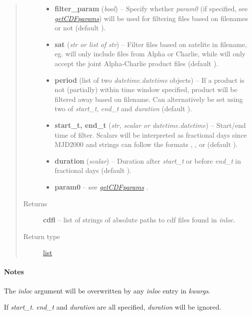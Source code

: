 \documentclass[letterpaper,10pt,english]{sphinxhowto}
\begin{document}
\begin{fulllineitems}
\begin{quote}
\begin{description}
\begin{itemize}
\item {} 
\textbf{filter\_param} (\emph{bool}) --
Specify whether \emph{param0} (if specified, see {\hyperref[swtools_doc:getcdfparams]{\emph{getCDFparams}}}) will
be used for filtering files based on filenames or not
(default ).

\item {} 
\textbf{sat} (\emph{str or list of str}) --
Filter files based on satelite in filename, eg.
 will only include files from Alpha or
Charlie, while  will only accept the joint
Alpha-Charlie product files (default ).

\item {} 
\textbf{period} (list of two \emph{datetime.datetime} objects) --
If a product is not (partially) within
time window specified, product will be filtered away based on
filename. Can alternatively be set using two of \emph{start\_t},
\emph{end\_t} and \emph{duration} (default ).

\item {} 
\textbf{start\_t, end\_t} (\emph{str, scalar or datetime.datetime}) --
Start/end time of filter. Scalars
will be interpreted as fractional days since MJD2000 and strings
can follow the formats , ,
 or  (default ).

\item {} 
\textbf{duration} (\emph{scalar}) --
Duration after \emph{start\_t} or before \emph{end\_t} in fractional days
(default ).

\item {} 
\textbf{param0} --
see {\hyperref[swtools_doc:getcdfparams]{\emph{getCDFparams}}} .

\end{itemize}

\item[{Returns}] \leavevmode
\textbf{cdfl} --
list of strings of absolute paths to cdf files found in \emph{inloc}.

\item[{Return type}] \leavevmode
\href{https://docs.python.org/library/functions.html\#list}{list}

\end{description}\end{quote}
\paragraph{Notes}

The \emph{inloc} argument will be overwritten by any \emph{inloc} entry in
\emph{kwargs}.

If \emph{start\_t}. \emph{end\_t} and \emph{duration} are all specified, \emph{duration}
will be ignored.

\end{fulllineitems}
\end{document}
